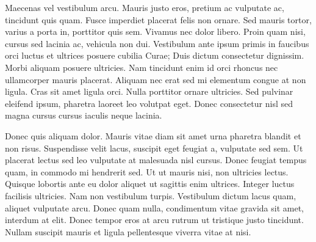 Maecenas vel vestibulum arcu. Mauris justo eros, pretium ac vulputate ac, tincidunt quis quam. Fusce imperdiet placerat felis non ornare. Sed mauris tortor, varius a porta in, porttitor quis sem. Vivamus nec dolor libero. Proin quam nisi, cursus sed lacinia ac, vehicula non dui. Vestibulum ante ipsum primis in faucibus orci luctus et ultrices posuere cubilia Curae; Duis dictum consectetur dignissim. Morbi aliquam posuere ultricies. Nam tincidunt enim id orci rhoncus nec ullamcorper mauris placerat. Aliquam nec erat sed mi elementum congue at non ligula. Cras sit amet ligula orci. Nulla porttitor ornare ultricies. Sed pulvinar eleifend ipsum, pharetra laoreet leo volutpat eget. Donec consectetur nisl sed magna cursus cursus iaculis neque lacinia. 

Donec quis aliquam dolor. Mauris vitae diam sit amet urna pharetra blandit et non risus. Suspendisse velit lacus, suscipit eget feugiat a, vulputate sed sem. Ut placerat lectus sed leo vulputate at malesuada nisl cursus. Donec feugiat tempus quam, in commodo mi hendrerit sed. Ut ut mauris nisi, non ultricies lectus. Quisque lobortis ante eu dolor aliquet ut sagittis enim ultrices. Integer luctus facilisis ultricies. Nam non vestibulum turpis. Vestibulum dictum lacus quam, aliquet vulputate arcu. Donec quam nulla, condimentum vitae gravida sit amet, interdum at elit. Donec tempor eros at arcu rutrum ut tristique justo tincidunt. Nullam suscipit mauris et ligula pellentesque viverra vitae at nisi. 